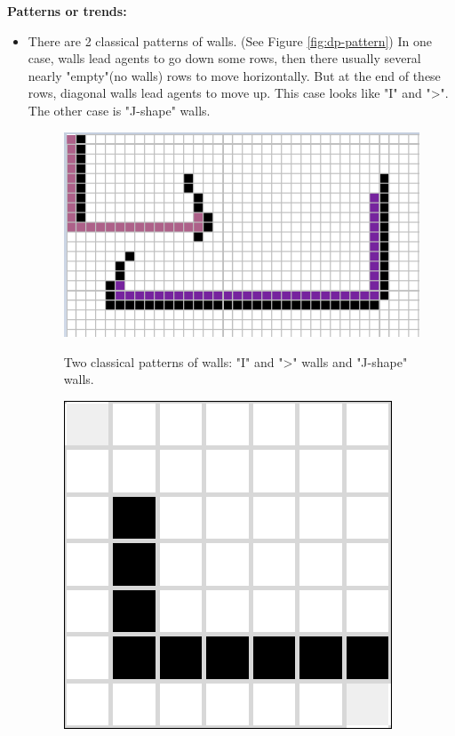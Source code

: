 \documentclass[letter]{article}
\begin{document}
\begin{enumerate}[resume]
\begin{enumerate}
\begin{enumerate}
\begin{figure}
				\end{figure}
				\textbf{Patterns or trends:} 
				\begin{itemize}
					\item {There are 2 classical patterns of walls. (See Figure \ref{fig:dp-pattern}) In one case, walls lead agents to go down some rows, then there usually several nearly "empty"(no walls) rows to move horizontally. But at the end of these rows, diagonal walls lead agents to move up. This case looks like "I" and ">". The other case is "J-shape" walls. }
					\begin{figure}
						\includegraphics[width=\textwidth]{../pics/dp/pattern.png}
						\caption{\label{fig:dp-pattern}Two classical patterns of walls: "I" and ">" walls and "J-shape" walls.}
						\endminipage\hfill
						\includegraphics[width=\textwidth]{../pics/dp/hardest.png}
						\caption{\label{fig:dp-hardest}}
						\endminipage
					\end{figure}
					

\end{itemize}
\end{enumerate}
\end{enumerate}
\end{enumerate}
\end{document}
